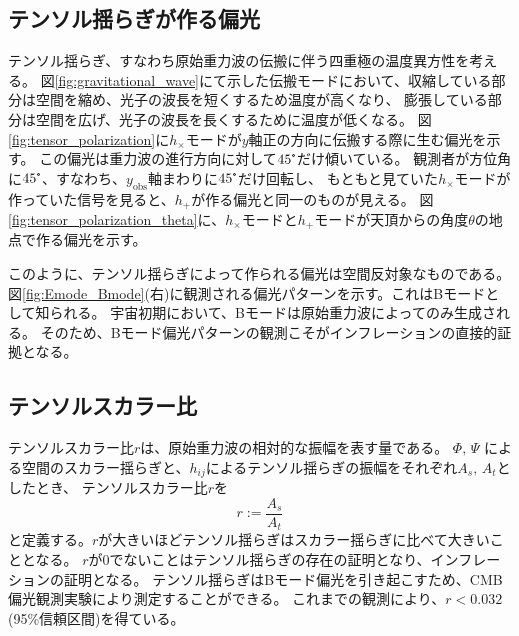 \documentclass[../../main.tex]{subfiles}
\begin{document}
\subsection{テンソル揺らぎが作る偏光}
テンソル揺らぎ、すなわち原始重力波の伝搬に伴う四重極の温度異方性を考える。
図\ref{fig:gravitational_wave}にて示した伝搬モードにおいて、収縮している部分は空間を縮め、光子の波長を短くするため温度が高くなり、
膨張している部分は空間を広げ、光子の波長を長くするために温度が低くなる。
図\ref{fig:tensor_polarization}に$h_{\times}$モードが$y$軸正の方向に伝搬する際に生む偏光を示す。
この偏光は重力波の進行方向に対して$45\tcdegree$だけ傾いている。
観測者が方位角に$45\tcdegree$、すなわち、$y_{\mathrm{obs}}$軸まわりに$45\tcdegree$だけ回転し、
もともと見ていた$h_{\times}$モードが作っていた信号を見ると、$h_{+}$が作る偏光と同一のものが見える。
図\ref{fig:tensor_polarization_theta}に、$h_{\times}$モードと$h_{+}$モードが天頂からの角度$\theta$の地点で作る偏光を示す。

このように、テンソル揺らぎによって作られる偏光は空間反対象なものである。
図\ref{fig:Emode_Bmode}(右)に観測される偏光パターンを示す。これはBモードとして知られる。
宇宙初期において、Bモードは原始重力波によってのみ生成される。
そのため、Bモード偏光パターンの観測こそがインフレーションの直接的証拠となる。


\subsection{テンソルスカラー比}
テンソルスカラー比$r$は、原始重力波の相対的な振幅を表す量である。
$\Phi,\,\Psi$ による空間のスカラー揺らぎと、$h_{ij}$によるテンソル揺らぎの振幅をそれぞれ$A_{s},\,A_{t}$としたとき、
テンソルスカラー比$r$を
\begin{equation}
    r := \dfrac{A_s}{A_t}
\end{equation}
と定義する。$r$が大きいほどテンソル揺らぎはスカラー揺らぎに比べて大きいこととなる。
$r$が0でないことはテンソル揺らぎの存在の証明となり、インフレーションの証明となる。
テンソル揺らぎはBモード偏光を引き起こすため、CMB偏光観測実験により測定することができる。
これまでの観測により、$r<0.032$(95\%信頼区間)を得ている\cite{PhysRevLett.127.151301}。
\end{document}
